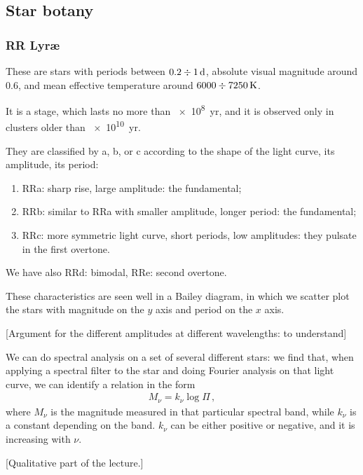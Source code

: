 \documentclass[main.tex]{subfiles}
\begin{document}
\subsection{Star botany}

\subsubsection{RR Lyr\ae}

These are stars with periods between \(\num{.2} \divisionsymbol \SI{1}{d}\), absolute visual magnitude around \num{+.6}, and mean effective temperature around \( \num{6000} \divisionsymbol\SI{7250}{K}\).

It is a stage, which lasts no more than \SI{e8}{yr}, and it is observed only in clusters older than \SI{e10}{yr}.

They are classified by a, b, or c according to the shape of the light curve, its amplitude, its period:

\begin{enumerate}
  \item RRa: sharp rise, large amplitude: the fundamental;
  \item RRb: similar to RRa with smaller amplitude, longer period: the fundamental;
  \item RRc: more symmetric light curve, short periods, low amplitudes: they pulsate in the first overtone.
\end{enumerate}

We have also RRd: bimodal, RRe: second overtone.

These characteristics are seen well in a Bailey diagram, in which we scatter plot the stars with magnitude on the \(y\) axis and period on the \(x\) axis.

[Argument for the different amplitudes at different wavelengths: to understand]

We can do spectral analysis on a set of several different stars: we find that, when applying a spectral filter to the star and doing Fourier analysis on that light curve, we can identify a relation in the form 
%
\begin{align}
M_\nu = k_\nu \log \Pi 
\,,
\end{align}
%
where \(M_{\nu }\) is the magnitude measured in that particular spectral band, while \(k_{\nu }\) is a constant depending on the band. \(k_{\nu }\) can be either positive or negative, and it is increasing with \(\nu \). 

[Qualitative part of the lecture.]
\end{document}
